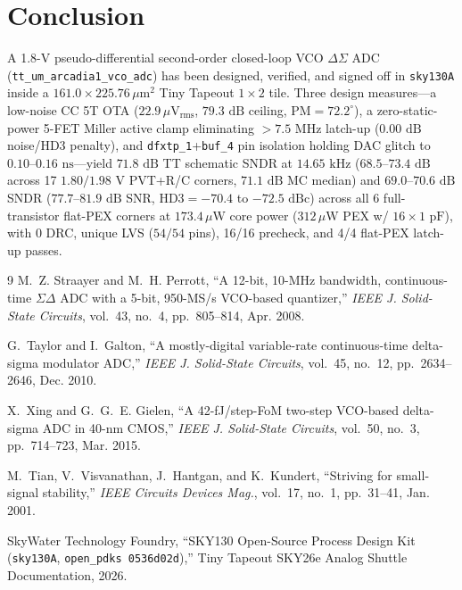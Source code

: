 \documentclass[10pt,twocolumn,letterpaper]{article}
\begin{document}
\section{Conclusion}
A 1.8-V pseudo-differential second-order closed-loop VCO $\Delta\Sigma$ ADC (\texttt{tt\_um\_arcadia1\_vco\_adc}) has been designed, verified, and signed off in \texttt{sky130A} inside a $161.0\times225.76\,\mu\text{m}^2$ Tiny Tapeout $1\times2$ tile. Three design measures---a low-noise CC 5T OTA ($22.9\,\mu\text{V}_{\text{rms}}$, $79.3\text{ dB}$ ceiling, $\text{PM}=72.2^\circ$), a zero-static-power 5-FET Miller active clamp eliminating $>7.5\text{ MHz}$ latch-up ($0.00\text{ dB}$ noise/HD3 penalty), and \texttt{dfxtp\_1}+\texttt{buf\_4} pin isolation holding DAC glitch to $0.10$--$0.16\text{ ns}$---yield $71.8\text{ dB}$ TT schematic SNDR at $14.65\text{ kHz}$ ($68.5$--$73.4\text{ dB}$ across 17 $1.80/1.98\text{ V}$ PVT+R/C corners, $71.1\text{ dB}$ MC median) and $69.0$--$70.6\text{ dB}$ SNDR ($77.7$--$81.9\text{ dB}$ SNR, $\text{HD3}=-70.4$ to $-72.5\text{ dBc}$) across all 6 full-transistor flat-PEX corners at $173.4\,\mu\text{W}$ core power ($312\,\mu\text{W}$ PEX w/ $16\times1\text{ pF}$), with 0 DRC, unique LVS ($54/54$ pins), 16/16 precheck, and 4/4 flat-PEX latch-up passes.

\begin{thebibliography}{9}
\scriptsize
\setlength{\itemsep}{1pt}
\setlength{\parskip}{0pt}
M.~Z. Straayer and M.~H. Perrott, ``A 12-bit, 10-MHz bandwidth, continuous-time $\Sigma\Delta$ ADC with a 5-bit, 950-MS/s VCO-based quantizer,'' \emph{IEEE J. Solid-State Circuits}, vol.~43, no.~4, pp.~805--814, Apr. 2008.

G.~Taylor and I.~Galton, ``A mostly-digital variable-rate continuous-time delta-sigma modulator ADC,'' \emph{IEEE J. Solid-State Circuits}, vol.~45, no.~12, pp.~2634--2646, Dec. 2010.

X.~Xing and G.~G.~E. Gielen, ``A 42-fJ/step-FoM two-step VCO-based delta-sigma ADC in 40-nm CMOS,'' \emph{IEEE J. Solid-State Circuits}, vol.~50, no.~3, pp.~714--723, Mar. 2015.

M.~Tian, V.~Visvanathan, J.~Hantgan, and K.~Kundert, ``Striving for small-signal stability,'' \emph{IEEE Circuits Devices Mag.}, vol.~17, no.~1, pp.~31--41, Jan. 2001.

SkyWater Technology Foundry, ``SKY130 Open-Source Process Design Kit (\textup{\texttt{sky130A}}, \textup{\texttt{open\_pdks 0536d02d}}),'' Tiny Tapeout SKY26e Analog Shuttle Documentation, 2026.
\end{thebibliography}
\end{document}
